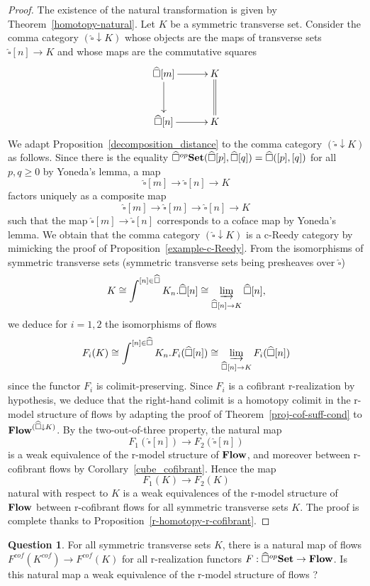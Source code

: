 \documentclass[a4paper,12pt]{amsart}
\makeatletter
\newcommand{\bpf}{\begin{proof}}
\newcommand{\epf}{\end{proof}}
\theoremstyle{definition}
\newtheorem{qu}[thm]{Question}
\newcommand{\fr}[1]{\ar@{->}[r]^-{#1}}
\newcommand{\fd}[1]{\ar@{->}[d]_-{#1}}
\newcommand{\iso}{\cong}
\renewcommand{\geq}{\geqslant}
\newcommand{\brm}[1]{{\rm{\mathbf{#1}}}}
\newcommand{\dtop}{{\brm{Flow}}}
\newcommand{\set}{{\brm{Set}}}
\newcommand{\ttt}{two-out-of-three property}
\newcommand{\liminj}{\varinjlim}
\newcommand{\ddownarrow}{{\downarrow}}
\makeatother
\begin{document}
\bpf
The existence of the natural transformation is given by Theorem~\ref{homotopy-natural}. Let $K$ be a symmetric transverse set. Consider the comma category $(\widehat{\square}\ddownarrow K)$ whose objects are the maps of transverse sets $\widehat{\square}[n]\to K$ and whose maps are the commutative squares 
\[
\xymatrix@C=3em@R=3em
{
\widehat{\square}[m]\fr{} \fd{} &  K \ar@{=}[d] \\
\widehat{\square}[n]\fr{} &  K
}
\]
We adapt Proposition~\ref{decomposition_distance} to the comma category $(\widehat{\square}\ddownarrow K)$ as follows. Since there is the equality  $\widehat{\square}^{op}\set(\widehat{\square}[p],\widehat{\square}[q]) = \widehat{\square}([p],[q])$ for all $p,q\geq 0$ by Yoneda's lemma, a map \[\widehat{\square}[m]\longrightarrow \widehat{\square}[n] \longrightarrow K\] factors uniquely as a composite map \[\widehat{\square}[m]\longrightarrow \widehat{\square}[m]\longrightarrow \widehat{\square}[n] \longrightarrow K\] such that the map $\widehat{\square}[m]\to \widehat{\square}[n]$ corresponds to a coface map by Yoneda's lemma. We obtain that  the comma category $(\widehat{\square}\ddownarrow K)$ is a c-Reedy category by mimicking the proof of Proposition~\ref{example-c-Reedy}. From the isomorphisms of symmetric transverse sets (symmetric transverse sets being presheaves over $\widehat{\square}$)
\[
K\iso \int^{[n]\in \widehat{\square}} K_n.\widehat{\square}[n] \iso \liminj_{\widehat{\square}[n]\to K} \widehat{\square}[n],
\]
we deduce for $i=1,2$ the isomorphisms of flows
\[
F_i(K) \iso \int^{[n]\in \widehat{\square}} K_n.F_i(\widehat{\square}[n]) \iso \liminj_{\widehat{\square}[n]\to K} F_i(\widehat{\square}[n])
\]
since the functor $F_i$ is colimit-preserving. Since $F_i$ is a cofibrant r-realization by hypothesis, we deduce that the right-hand colimit is a homotopy colimit in the r-model structure of flows by adapting the proof of Theorem~\ref{proj-cof-suff-cond} to $\dtop^{(\widehat{\square}\ddownarrow K)}$. By the \ttt, the natural map \[F_1(\widehat{\square}[n])\longrightarrow F_2(\widehat{\square}[n])\] is a weak equivalence of the r-model structure of $\dtop$, and moreover between r-cofibrant flows by Corollary~\ref{cube_cofibrant}. Hence the map \[F_1(K)\longrightarrow F_2(K)\] natural with respect to $K$ is a weak equivalences of the r-model structure of $\dtop$ between r-cofibrant flows for all symmetric transverse sets $K$. The proof is complete thanks to Proposition~\ref{r-homotopy-r-cofibrant}. 
\epf

\begin{qu}
	For all symmetric transverse sets $K$, there is a natural map of flows $F^{cof}(K^{cof})\to F^{cof}(K)$ for all r-realization functors $F:\widehat{\square}^{op}\set\to \dtop$. Is this natural map a weak equivalence of the r-model structure of flows ?
\end{qu}
\end{document}
